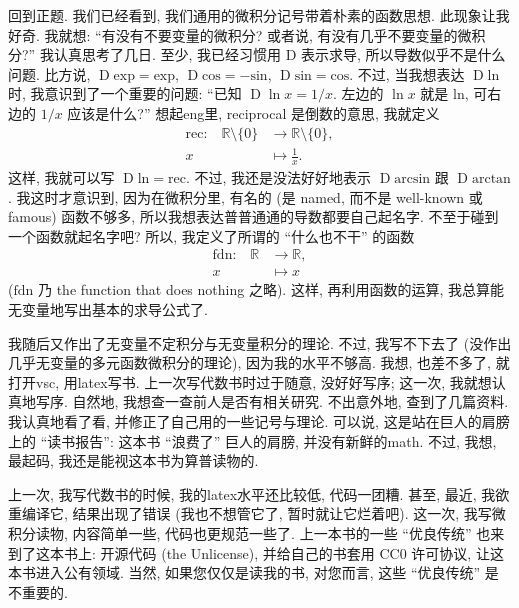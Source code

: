 回到正题.
我们已经看到, 我们通用的微积分记号带着朴素的函数思想.
此现象让我好奇.
我就想:
``有没有不要变量的微积分?
或者说, 有没有几乎不要变量的微积分?''
我认真思考了几日.
至少, 我已经习惯用 $\mathrm{D}$ 表示求导,
所以导数似乎不是什么问题.
比方说,
$\operatorname{D} \mathrm{exp} = \mathrm{exp}$,
$\operatorname{D} \mathrm{cos} = -\mathrm{sin}$,
$\operatorname{D} \mathrm{sin} = \mathrm{cos}$.
不过,
当我想表达 $\operatorname{D} \mathrm{ln}$ 时,
我意识到了一个重要的问题:
``已知 $\operatorname{D} \ln {x} = 1/x$.
左边的 $\ln {x}$ 就是 $\mathrm{ln}$,
可右边的 $1/x$ 应该是什么?''
想起\gls{eng}里, reciprocal 是倒数的意思, 我就定义
\begin{align*}
    \text{$\mathrm{rec}$:} \quad
    \mathbb{R} \setminus \{ 0 \} & \to \mathbb{R} \setminus \{ 0 \}, \\
    x                            & \mapsto \frac{1}{x}.
\end{align*}
这样, 我就可以写
$\operatorname{D} \mathrm{ln} = \mathrm{rec}$.
不过, 我还是没法好好地表示
$\operatorname{D} \mathrm{arcsin}$
跟
$\operatorname{D} \mathrm{arctan}$.
我这时才意识到,
因为在微积分里,
有名的 (是 named, 而不是 well-known 或 famous) 函数不够多,
所以我想表达普普通通的导数都要自己起名字.
不至于碰到一个函数就起名字吧?
所以, 我定义了所谓的 ``什么也不干'' 的函数
\begin{align*}
    \text{$\mathrm{fdn}$:} \quad
    \mathbb{R} & \to \mathbb{R}, \\
    x          & \mapsto x
\end{align*}
($\mathrm{fdn}$ 乃 the function that does nothing 之略).
这样, 再利用函数的运算,
我总算能无变量地写出基本的求导公式了.

我随后又作出了无变量不定积分与无变量积分的理论.
不过, 我写不下去了
(没作出几乎无变量的多元函数微积分的理论),
因为我的水平不够高.
我想, 也差不多了, 就打开\gls{vsc}, 用\gls{latex}写书.
上一次写代数书时过于随意, 没好好写序;
这一次, 我就想认真地写序.
自然地, 我想查一查前人是否有相关研究.
不出意外地, 查到了几篇资料.
我认真地看了看, 并修正了自己用的一些记号与理论.
可以说, 这是站在巨人的肩膀上的 ``读书报告'':
这本书 ``浪费了'' 巨人的肩膀, 并没有新鲜的\gls{math}.
不过, 我想, 最起码, 我还是能视这本书为算普读物的.

上一次, 我写代数书的时候, 我的\gls{latex}水平还比较低, 代码一团糟.
甚至, 最近, 我欲重编译它, 结果出现了错误
(我也不想管它了, 暂时就让它烂着吧).
这一次, 我写微积分读物, 内容简单一些, 代码也更规范一些了.
上一本书的一些 ``优良传统'' 也来到了这本书上:
开源代码 (the Unlicense),
并给自己的书套用 CC0 许可协议, 让这本书进入公有领域.
当然, 如果您仅仅是读我的书, 对您而言,
这些 ``优良传统'' 是不重要的.

